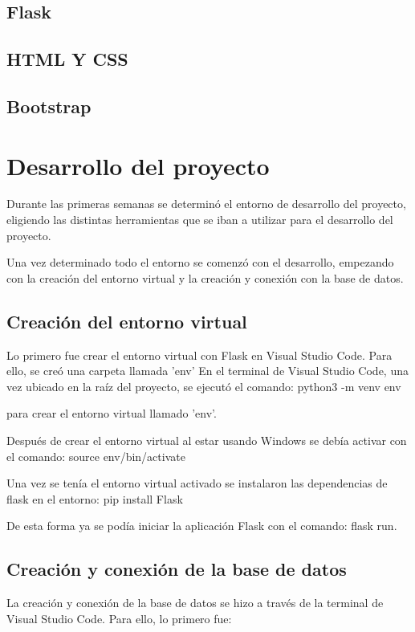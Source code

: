 \subsection{Flask}

\subsection{HTML Y CSS}

\subsection{Bootstrap}

\section{Desarrollo del proyecto}
Durante las primeras semanas se determinó el entorno de desarrollo del proyecto, eligiendo las distintas herramientas que se iban a utilizar para el desarrollo del proyecto.

Una vez determinado todo el entorno se comenzó con el desarrollo, empezando con la creación del entorno virtual y la creación y conexión con la base de datos.

\subsection{Creación del entorno virtual}
Lo primero fue crear el entorno virtual con Flask en Visual Studio Code. Para ello, se creó una carpeta llamada 'env'
En el terminal de Visual Studio Code, una vez ubicado en la raíz del proyecto, se
ejecutó el comando: python3 -m venv env

 para crear el entorno virtual llamado 'env'.

Después de crear el entorno virtual al estar usando Windows se debía activar con el comando:
source env/bin/activate

Una vez se tenía el entorno virtual activado se instalaron las dependencias de flask en el entorno:
pip install Flask

De esta forma ya se podía iniciar la aplicación Flask con el comando: flask run.

\subsection{Creación y conexión de la base de datos}
La creación y conexión de la base de datos se hizo a través de la terminal de Visual Studio Code.
Para ello, lo primero fue:

